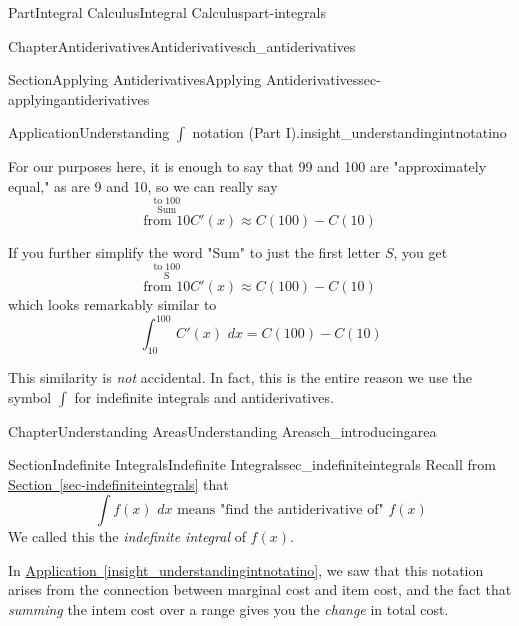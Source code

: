 \documentclass[oneside,10pt,]{tufte-book}
\newcommand{\xreffont}{\relax}
\numberwithin{equation}{chapter}
\newcommand{\intdx}[1]{{\,\int#1\,\,dx}}
\begin{document}
\begin{partptx}{Part}{Integral Calculus}{}{Integral Calculus}{}{}{part-integrals}
\begin{chapterptx}{Chapter}{Antiderivatives}{}{Antiderivatives}{}{}{ch_antiderivatives}
\begin{sectionptx}{Section}{Applying Antiderivatives}{}{Applying Antiderivatives}{}{}{sec-applyingantiderivatives}
\begin{insight}{Application}{Understanding \(\int\) notation (Part I).}{insight_understandingintnotatino}
\par
For our purposes here, it is enough to say that 99 and 100 are "approximately equal," as are 9 and 10, so we can really say%
\begin{equation*}
\stackrel{ \scriptstyle\text{to 100} }{  \stackrel{\textstyle\text{Sum}}{ \scriptstyle\text{from 10} }  } C'(x)
\approx
C(100) - C(10)
\end{equation*}
%
\par
If you further simplify the word "Sum" to just the first letter \(S\), you get%
\begin{equation*}
\stackrel{ \scriptstyle\text{to 100} }{  \stackrel{\textstyle\text{S}}{ \scriptstyle\text{from 10} }  } C'(x)
\approx
C(100) - C(10)
\end{equation*}
which looks remarkably similar to%
\begin{equation*}
\intdx{_{10}^{100} \, C'(x)} = C(100) - C(10)
\end{equation*}
%
\par
This similarity is \emph{not} accidental. In fact, this is the entire reason we use the symbol \(\int\) for indefinite integrals and antiderivatives.%
\end{insight}
\end{sectionptx}
\end{chapterptx}
%
\typeout{************************************************}
\typeout{************************************************}
%
\begin{chapterptx}{Chapter}{Understanding Areas}{}{Understanding Areas}{}{}{ch_introducingarea}
\renewcommand*{\chaptername}{Chapter}
%
%
\typeout{************************************************}
\typeout{************************************************}
%
\begin{sectionptx}{Section}{Indefinite Integrals}{}{Indefinite Integrals}{}{}{sec_indefiniteintegrals}
Recall from \hyperref[sec-indefiniteintegrals]{Section~{\xreffont\ref{sec-indefiniteintegrals}}} that%
\begin{equation*}
\intdx{f(x)} \text{ means "find the antiderivative of" } f(x) 
\end{equation*}
We called this the \emph{indefinite integral} of \(f(x)\).%
\par
In \hyperref[insight_understandingintnotatino]{Application~{\xreffont\ref{insight_understandingintnotatino}}}, we saw that this notation arises from the connection between marginal cost and item cost, and the fact that \emph{summing} the intem cost over a range gives you the \emph{change} in total cost.%

\end{sectionptx}
\end{chapterptx}
\end{partptx}
\end{document}
